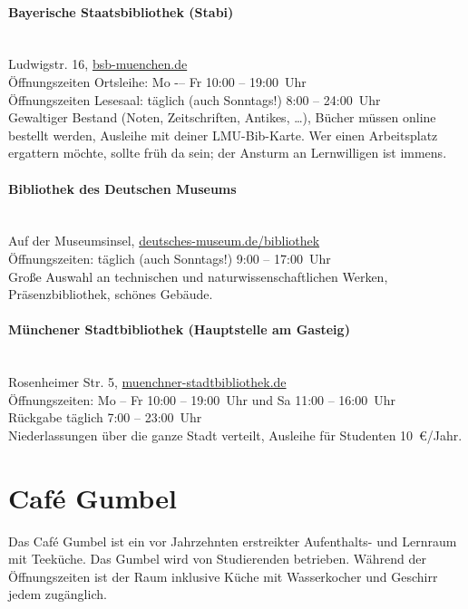 \documentclass[twoside,12pt,parskip=half-]{scrartcl}
\begin{document}
\paragraph{Bayerische Staatsbibliothek (Stabi)}\hfill\\
Ludwigstr. 16, \url{bsb-muenchen.de}\\
Öffnungszeiten Ortsleihe: Mo -– Fr 10:00 -- 19:00~Uhr\\
Öffnungszeiten Lesesaal: täglich (auch Sonntags!) 8:00 -- 24:00~Uhr\\
Gewaltiger Bestand (Noten, Zeitschriften, Antikes, \ldots), Bücher
müssen online bestellt werden, Ausleihe mit deiner LMU-Bib-Karte. Wer
einen Arbeitsplatz ergattern möchte, sollte früh da sein; der
Ansturm an Lernwilligen ist immens.

\paragraph{Bibliothek des Deutschen Museums}\hfill\\
Auf der Museumsinsel, \url{deutsches-museum.de/bibliothek}\\
Öffnungszeiten: täglich (auch Sonntags!) 9:00 -- 17:00~Uhr\\
Große Auswahl an technischen und naturwissenschaftlichen Werken, Präsenzbibliothek, schönes Gebäude.

\paragraph{Münchener Stadtbibliothek (Hauptstelle am Gasteig)}\hfill\\
Rosenheimer Str. 5, \url{muenchner-stadtbibliothek.de}\\
Öffnungszeiten: Mo -- Fr 10:00 -- 19:00~Uhr und Sa 11:00 -- 16:00~Uhr\\
Rückgabe täglich 7:00 -- 23:00~Uhr\\
Niederlassungen über die ganze Stadt verteilt, Ausleihe für Studenten 10~€/Jahr.

\clearpage


\section{Café Gumbel}

Das Café Gumbel ist ein vor Jahrzehnten erstreikter Aufenthalts- und Lernraum mit Teeküche.  Das Gumbel wird von Studierenden betrieben.  Während der
Öffnungszeiten ist der Raum inklusive Küche mit Wasserkocher und Geschirr
jedem zugänglich.
\end{document}
